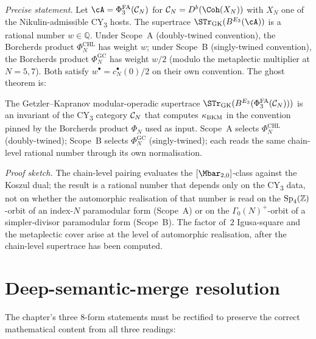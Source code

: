 \emph{Precise statement.} Let $\cA = \PhiFAt(\Cker_N)$ for
$\Cker_N = D^b(\Coh(X_N))$ with $X_N$ one of the Nikulin-admissible
CY\textsubscript{3} hosts. The supertrace
$\STr_{\mathrm{GK}}(\BE{3}(\cA))$ is a rational number $w \in \mathbb
Q$. Under Scope~A (doubly-twined convention), the Borcherds product
$\Phi_N^{\mathrm{CHL}}$ has weight $w$; under Scope~B (singly-twined
convention), the Borcherds product $\Phi_N^{\mathrm{GC}}$ has weight
$w/2$ (modulo the metaplectic multiplier at $N = 5, 7$). Both satisfy
$w^\bullet = c_N^\bullet(0)/2$ on their own convention. The ghost
theorem is:

\begin{theorem*}
The Getzler--Kapranov modular-operadic supertrace
$\STr_{\mathrm{GK}}(\BE{3}(\PhiFAt(\Cker_N)))$ is an invariant of the
CY\textsubscript{3} category $\mathcal C_N$ that computes $\kappa_{\mathrm{BKM}}$ in the
convention pinned by the Borcherds product $\Phi_N$ used as input.
Scope~A selects $\Phi_N^{\mathrm{CHL}}$ (doubly-twined); Scope~B
selects $\Phi_N^{\mathrm{GC}}$ (singly-twined); each reads the same
chain-level rational number through its own normalisation.
\end{theorem*}

\emph{Proof sketch.} The chain-level pairing evaluates the
$[\Mbar_{2, 0}]$-class against the Koszul dual; the result is a
rational number that depends only on the CY\textsubscript{3} data, not
on whether the automorphic realisation of that number is read on the
$\mathrm{Sp}_4(\mathbb Z)$-orbit of an index-$N$ paramodular form (Scope~A) or on the
$\Gamma_0(N)^+$-orbit of a simpler-divisor paramodular form (Scope~B).
The factor of~$2$ Igusa-square and the metaplectic cover arise at the
level of automorphic realisation, after the chain-level supertrace has
been computed.

\section*{Deep-semantic-merge resolution}

The chapter's three 8-form statements must be rectified to preserve
the correct mathematical content from all three readings:

